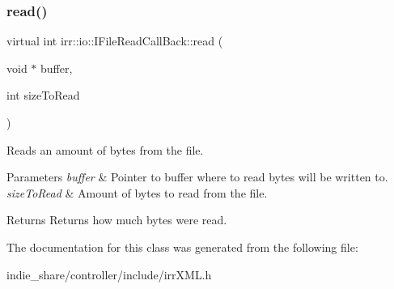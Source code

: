 \subsubsection{\texorpdfstring{read()}{read()}\hspace{0.1cm}{\footnotesize\ttfamily [2/2]}}
{\footnotesize\ttfamily virtual int irr\+::io\+::\+I\+File\+Read\+Call\+Back\+::read (\begin{DoxyParamCaption}\item[{void $\ast$}]{buffer,  }\item[{int}]{size\+To\+Read }\end{DoxyParamCaption})\hspace{0.3cm}{\ttfamily [pure virtual]}}



Reads an amount of bytes from the file. 


\begin{DoxyParams}{Parameters}
{\em buffer} & Pointer to buffer where to read bytes will be written to. \\
\hline
{\em size\+To\+Read} & Amount of bytes to read from the file. \\
\hline
\end{DoxyParams}
\begin{DoxyReturn}{Returns}
Returns how much bytes were read. 
\end{DoxyReturn}


The documentation for this class was generated from the following file\+:\begin{DoxyCompactItemize}
\item 
indie\+\_\+share/controller/include/irr\+X\+M\+L.\+h\end{DoxyCompactItemize}
